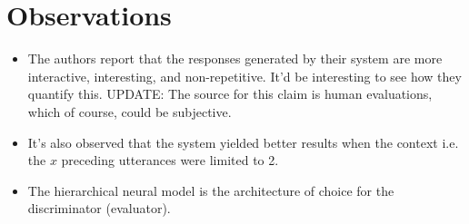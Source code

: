 \documentclass[12pt]{article}
\begin{document}
\section{Observations}
  \begin{itemize}
    \item The authors report that the responses generated by their system are more interactive, interesting, and non-repetitive. It'd be interesting to see how they quantify this. UPDATE: The source for this claim is human evaluations, which of course, could be subjective.
    \item It's also observed that the system yielded better results when the context i.e. the $x$ preceding utterances were limited to 2.
    \item The hierarchical neural model is the architecture of choice for the discriminator (evaluator).
  \end{itemize}



\end{document}
